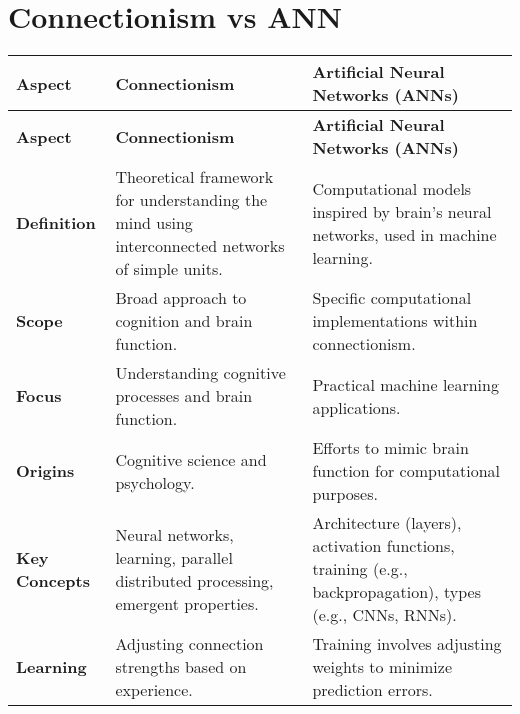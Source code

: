 
\section{Connectionism vs ANN \cite{chatgpt,arxiv-2405.04048}}\label{connectionism vs ann}


\begin{longtable}{|>{\raggedright\arraybackslash}p{3cm}|>{\raggedright\arraybackslash}p{6cm}|>{\raggedright\arraybackslash}p{6cm}|}
    
    \hline
    \textbf{Aspect} & \textbf{Connectionism} & \textbf{Artificial Neural Networks (ANNs)} \\
    \hline
    \endfirsthead
    
    \hline
    \textbf{Aspect} & \textbf{Connectionism} & \textbf{Artificial Neural Networks (ANNs)} \\
    \hline\endhead
    
    \hline\endfoot
    
    \hline\endlastfoot
    
    \textbf{Definition} & Theoretical framework for understanding the mind using interconnected networks of simple units. & Computational models inspired by brain's neural networks, used in machine learning. \\
    \hline
    
    \textbf{Scope} & Broad approach to cognition and brain function. & Specific computational implementations within connectionism. \\
    \hline
    
    \textbf{Focus} & Understanding cognitive processes and brain function. & Practical machine learning applications. \\
    \hline
    
    \textbf{Origins} & Cognitive science and psychology. & Efforts to mimic brain function for computational purposes. \\
    \hline
    
    \textbf{Key Concepts} & Neural networks, learning, parallel distributed processing, emergent properties. & Architecture (layers), activation functions, training (e.g., backpropagation), types (e.g., CNNs, RNNs). \\
    \hline
    
    \textbf{Learning} & Adjusting connection strengths based on experience. & Training involves adjusting weights to minimize prediction errors. \\
    \hline
    

\end{longtable}
